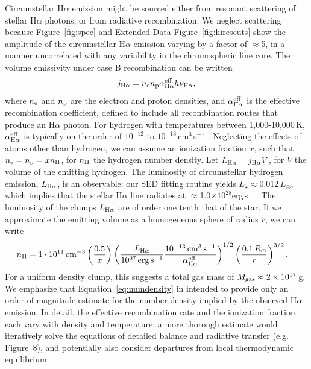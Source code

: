 \documentclass{nature3}
\begin{document}
\begin{methods}
Circumstellar H$\alpha$ emission might be sourced either from resonant
scattering of stellar H$\alpha$ photons, or from radiative
recombination.  We neglect scattering because Figure~\ref{fig:spec}
and Extended Data Figure~\ref{fig:hirescuts} show the amplitude of the
circumstellar H$\alpha$ emission varying by a factor of $\approx$5, in
a manner uncorrelated with any variability in the chromospheric line
core.  The volume emissivity under case B recombination can be written
\begin{equation} j_{\rm H\alpha} = n_{\rm e} n_{\rm p} \alpha^{\rm
eff}_{\rm H\alpha} h \nu_{\rm H\alpha}, \end{equation} where $n_{\rm
e}$ and $n_{\rm p}$ are the electron and proton densities, and
$\alpha^{\rm eff}_{\rm H\alpha}$ is the effective recombination
coefficient, defined to include all recombination routes that produce
an H$\alpha$ photon.  For hydrogen with temperatures between
1,000-10,000\,K, $\alpha^{\rm eff}_{\rm H\alpha}$ is typically on the
order of $10^{-12}$ to $10^{-13}$\,cm$^3$\,s$^{-1}$
\cite{Hummer1987,Draine2011}.  Neglecting the effects of atoms other
than hydrogen, we can assume an ionization fraction $x$, such that
$n_{\rm e} = n_{\rm p} = x n_{\rm H}$, for $n_{\rm H}$ the hydrogen
number density.  Let $L_{\rm H\alpha} = j_{\rm H\alpha} V$, for $V$
the volume of the emitting hydrogen.  The luminosity of circumstellar
hydrogen emission, $L_{\rm H\alpha}$, is an observable: our SED
fitting routine yields $L_\star$$\approx$0.012\,$L_\odot$, which
implies that the stellar H$\alpha$ line radiates at
$\approx$1.0$\times$$10^{28}$erg\,s$^{-1}$.  The luminosity of the
clumps $L_{\rm H\alpha}$ are of order one tenth that of the star.  If
we approximate the emitting volume as a homogeneous sphere of radius
$r$, we can write
\begin{align}
  n_{\rm H} &= 
  1 \cdot 10^{11}\,{\rm cm}^{-3}
  \left(
    \frac{0.5}{x}
  \right)
  \left( 
    \frac{ L_{\rm H\alpha} }{ 10^{27}\,{\rm erg\,s^{-1}} }
    \frac{ 10^{-13}\,{\rm cm^{3}\,s^{-1}} }{ \alpha^{\rm eff}_{\rm H\alpha} }
  \right)^{1/2}
  \left(
    \frac{ 0.1\,R_\odot }{ r }
  \right)^{3/2}.
  \label{eq:numdensity}
\end{align}
For a uniform density clump, this suggests a total gas mass of $M_{\rm
gas}\approx 2\times10^{17}$\,g.  We emphasize that
Equation~\ref{eq:numdensity} in intended to provide only an order of
magnitude estimate for the number density implied by the observed
H$\alpha$ emission.  In detail, the effective recombination rate and
the ionization fraction each vary with density and temperature; a more
thorough estimate would iteratively solve the equations of detailed
balance and radiative transfer (e.g.~\cite{CollierCameron1989}
Figure~8), and potentially also consider departures from local
thermodynamic equilibrium.


\end{methods}
\end{document}
